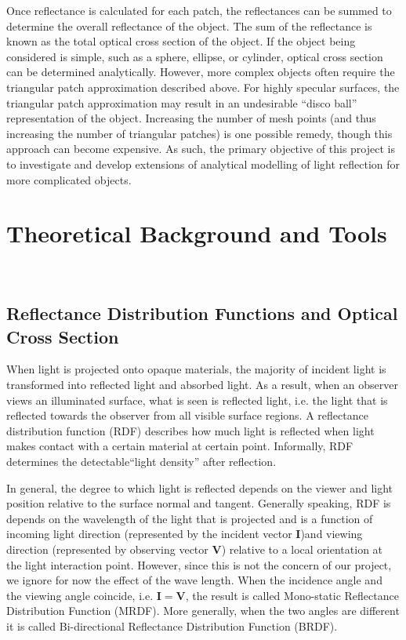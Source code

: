 \documentclass[11pt,reqno]{amsart}
\theoremstyle{definition}
\begin{document}
Once reflectance is calculated for each patch, the reflectances can be summed
to determine the overall reflectance of the object.  The sum of the reflectance
is known as the total optical cross section of the object.  If the object being
considered is simple, such as a sphere, ellipse, or cylinder, optical cross
section can be determined analytically.  However, more complex objects often
require the triangular patch approximation described above.  For highly
specular surfaces, the triangular patch approximation may result in an
undesirable ``disco ball'' representation of the object.  Increasing the number
of mesh points (and thus increasing the number of triangular patches) is one
possible remedy, though this approach can become expensive.  As
such, the primary objective of this project is to investigate and develop
extensions of analytical modelling of light reflection for more complicated
objects. 

\section{Theoretical Background and Tools}~\\
\subsection{Reflectance Distribution Functions and Optical Cross Section}
When light is projected onto opaque materials, the majority of incident light
is transformed into reflected light and absorbed light. As a result, when an
observer views an illuminated surface, what is seen is reflected light, i.e.
the light that is reflected towards the observer from all visible surface
regions. A reflectance distribution function (RDF) describes how much light is
reflected when light makes contact with a certain material at certain point. 
Informally, RDF determines the detectable``light density'' after
reflection. 

In general, the degree to which light is reflected depends on the viewer and
light position relative to the surface normal and tangent. Generally speaking,
RDF is depends on the wavelength of the light that is projected and is a
function of incoming light direction (represented by the incident vector
\textbf{I})and viewing direction (represented by observing vector \textbf{V})
relative to a local orientation at the light interaction point. However, since
this is not the concern of our project, we ignore for now the effect of the
wave length. When the incidence angle and the viewing angle coincide, i.e.
$\mathbf{I}=\mathbf{V}$, the result is called Mono-static Reflectance
Distribution Function (MRDF). More generally, when the two angles are different
it is called Bi-directional Reflectance Distribution Function (BRDF). 
\end{document}
